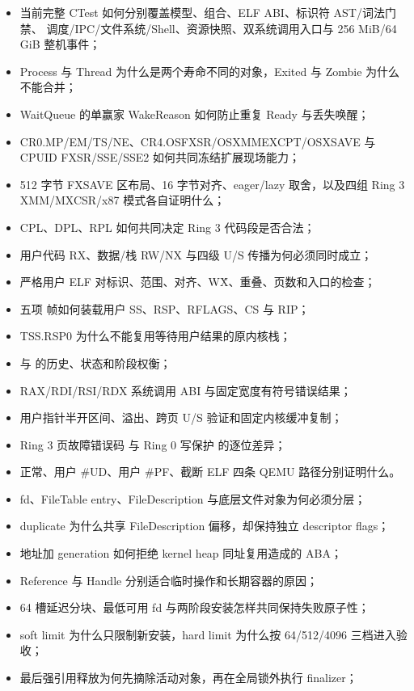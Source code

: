 \begin{itemize}
  \item 当前完整 CTest 如何分别覆盖模型、组合、ELF ABI、标识符 AST/词法门禁、
        调度/IPC/文件系统/Shell、资源快照、双系统调用入口与
        256 MiB/64 GiB 整机事件；
  \item Process 与 Thread 为什么是两个寿命不同的对象，Exited 与 Zombie
        为什么不能合并；
  \item WaitQueue 的单赢家 WakeReason 如何防止重复 Ready 与丢失唤醒；
  \item CR0.MP/EM/TS/NE、CR4.OSFXSR/OSXMMEXCPT/OSXSAVE 与
        CPUID FXSR/SSE/SSE2 如何共同冻结扩展现场能力；
  \item 512 字节 FXSAVE 区布局、16 字节对齐、eager/lazy 取舍，以及四组
        Ring 3 XMM/MXCSR/x87 模式各自证明什么；
  \item CPL、DPL、RPL 如何共同决定 Ring 3 代码段是否合法；
  \item 用户代码 RX、数据/栈 RW/NX 与四级 U/S 传播为何必须同时成立；
  \item 严格用户 ELF 对标识、范围、对齐、W\^X、重叠、页数和入口的检查；
  \item 五项  帧如何装载用户 SS、RSP、RFLAGS、CS 与 RIP；
  \item TSS.RSP0 为什么不能复用等待用户结果的原内核栈；
  \item {} 与  的历史、状态和阶段权衡；
  \item RAX/RDI/RSI/RDX 系统调用 ABI 与固定宽度有符号错误结果；
  \item 用户指针半开区间、溢出、跨页 U/S 验证和固定内核缓冲复制；
  \item Ring 3 页故障错误码  与 Ring 0 写保护
         的逐位差异；
  \item 正常、用户 \#UD、用户 \#PF、截断 ELF 四条 QEMU 路径分别证明什么。
  \item fd、FileTable entry、FileDescription 与底层文件对象为何必须分层；
  \item duplicate 为什么共享 FileDescription 偏移，却保持独立 descriptor flags；
  \item 地址加 generation 如何拒绝 kernel heap 同址复用造成的 ABA；
  \item Reference 与 Handle 分别适合临时操作和长期容器的原因；
  \item 64 槽延迟分块、最低可用 fd 与两阶段安装怎样共同保持失败原子性；
  \item soft limit 为什么只限制新安装，hard limit 为什么按 64/512/4096
        三档进入验收；
  \item 最后强引用释放为何先摘除活动对象，再在全局锁外执行 finalizer；

\end{itemize}
